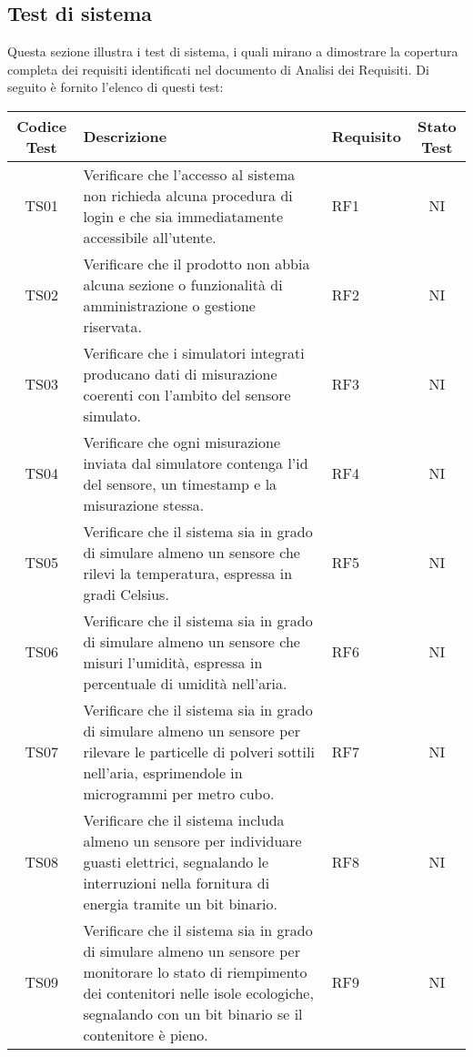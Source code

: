 \subsection{Test di sistema}
Questa sezione illustra i test di sistema, i quali mirano a dimostrare la copertura completa dei requisiti identificati nel documento di Analisi dei Requisiti. Di seguito è fornito l'elenco di questi test:
\\
\begin{longtable}{|c|p{5cm}|>{\raggedright}p{2cm}|c|}
        \hline
        Codice Test & Descrizione & Requisito & Stato Test \\
        \hline
        TS01 & Verificare che l'accesso al sistema non richieda alcuna procedura di login e che sia immediatamente accessibile all'utente. & RF1 & NI \\
        \hline
        TS02 & Verificare che il prodotto non abbia alcuna sezione o funzionalità di amministrazione o gestione riservata. & RF2 & NI \\
        \hline
        TS03 & Verificare che i simulatori integrati producano dati di misurazione coerenti con l'ambito del sensore simulato. & RF3 & NI \\
        \hline
        TS04 & Verificare che ogni misurazione inviata dal simulatore contenga l'id del sensore, un timestamp e la misurazione stessa. & RF4 & NI \\
        \hline
        TS05 & Verificare che il sistema sia in grado di simulare almeno un sensore che rilevi la temperatura, espressa in gradi Celsius. & RF5 & NI \\
        \hline
        TS06 & Verificare che il sistema sia in grado di simulare almeno un sensore che misuri l'umidità, espressa in percentuale di umidità nell'aria.
        & RF6 & NI \\
        \hline
        TS07 & Verificare che il sistema sia in grado di simulare almeno un sensore per rilevare le particelle di polveri sottili nell'aria, esprimendole in microgrammi per metro cubo. & RF7 & NI \\
        \hline
        TS08 & Verificare che il sistema includa almeno un sensore per individuare guasti elettrici, segnalando le interruzioni nella fornitura di energia tramite un bit binario. & RF8 & NI \\
        \hline
        TS09 & Verificare che il sistema sia in grado di simulare almeno un sensore per monitorare lo stato di riempimento dei contenitori nelle isole ecologiche, segnalando con un bit binario se il contenitore è pieno. & RF9 & NI \\

\end{longtable}
